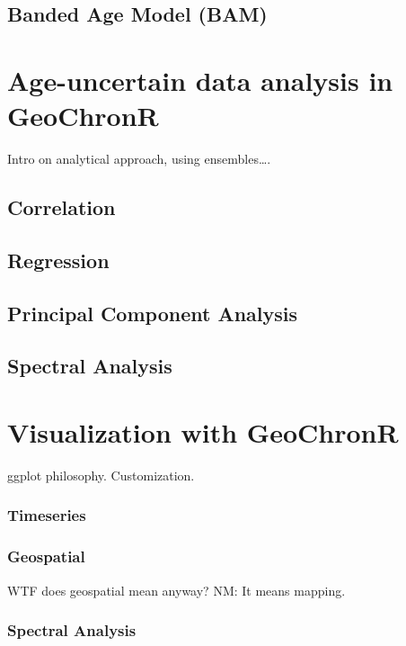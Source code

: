 \documentclass[gc, manuscript]{copernicus}
\begin{document}
\subsection{Banded Age Model (BAM)}

\hypertarget{sec:age-uncertain-analysis}{%
\section{Age-uncertain data analysis in GeoChronR}\label{sec:age-uncertain-analysis}}

Intro on analytical approach, using ensembles\ldots{}.

\subsection{Correlation}

\subsection{Regression}

\subsection{Principal Component Analysis}

\subsection{Spectral Analysis}

\hypertarget{sec:visualization}{%
\section{Visualization with GeoChronR}\label{sec:visualization}}

ggplot philosophy. Customization.

\subsubsection{Timeseries}

\subsubsection{Geospatial}

WTF does geospatial mean anyway?
NM: It means mapping.

\subsubsection{Spectral Analysis}
\end{document}
